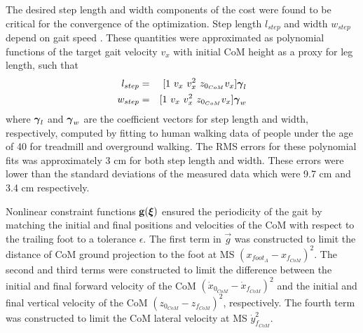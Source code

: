The desired step length and width components of the cost were found to be critical for the convergence of the optimization. Step length $ l_{step} $ and width $ w_{step} $ depend on gait speed \cite{andriacchi1977walking}. These quantities were approximated as polynomial functions of the target gait velocity $ v_x $ with initial CoM height as a proxy for leg length, such that
\begin{eqnarray}
	l_{step} &=& [1\ v_x\ v_x^2\ z_{0_{CoM}} v_x] \boldsymbol{\gamma}_l \\
	w_{step} &=& [1\ v_x\ v_x^2\ z_{0_{CoM}} v_x] \boldsymbol{\gamma}_w
\end{eqnarray}
%
where $ \boldsymbol{\gamma}_l $ and $ \boldsymbol{\gamma}_w $ are the coefficient vectors for step length and width, respectively, computed by fitting to human walking data of people under the age of 40 for treadmill and overground walking. The RMS errors for these polynomial fits was approximately 3 cm for both step length and width. These errors were lower than the standard deviations of the measured data which were 9.7 cm and 3.4 cm respectively.
%

Nonlinear constraint functions $ \mathbf{g}(\boldsymbol{\xi}) $ ensured the periodicity of the gait by matching the initial and final positions and velocities of the CoM with respect to the trailing foot to a tolerance $ \epsilon $. The first term in $ \vec{g} $ was constructed to limit the distance of CoM ground projection to the foot at MS $ (x_{foot_A} - x_{f_{CoM}})^2  $. The second and third terms were constructed to limit the difference between the initial and final forward velocity of the CoM $ (\dot{x}_{0_{CoM}} - \dot{x}_{f_{CoM}} )^2 $ and the initial and final vertical velocity of the CoM $ (z_{0_{CoM}} - z_{f_{CoM}})^2 $, respectively. The fourth term was constructed to limit the CoM lateral velocity at MS $ \dot{y}_{f_{CoM}}^2 $.
%	

